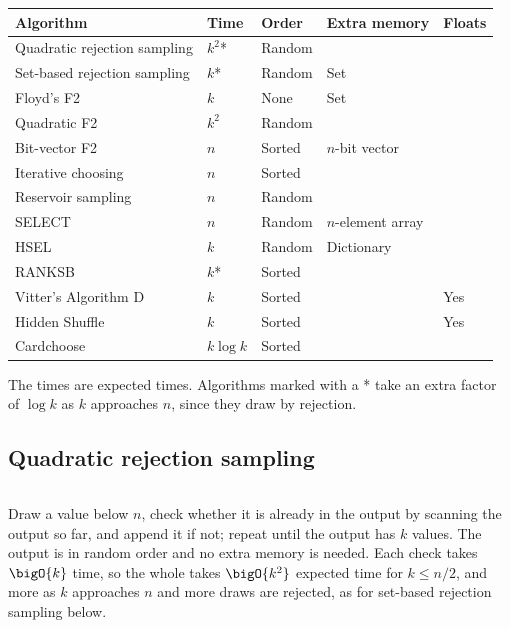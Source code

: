 \documentclass[letterpaper,11pt]{article}
\begin{document}
\begin{center}
    \begin{tabular}{l|l|l|l|l}
    Algorithm & Time & Order & Extra memory & Floats \\
    \hline
    Quadratic rejection sampling & \(k^2\)* & Random &  & \\
    Set-based rejection sampling & \(k\)* & Random & Set & \\
    Floyd's F2 & \(k\) & None & Set & \\
    Quadratic F2 & \(k^2\) & Random &  & \\
    Bit-vector F2 & \(n\) & Sorted & \(n\)-bit vector & \\
    Iterative choosing & \(n\) & Sorted &  & \\
    Reservoir sampling & \(n\) & Random &  & \\
    SELECT & \(n\) & Random & \(n\)-element array & \\
    HSEL & \(k\) & Random & Dictionary & \\
    RANKSB & \(k\)* & Sorted &  & \\
    Vitter's Algorithm D & \(k\) & Sorted &  & Yes \\
    Hidden Shuffle & \(k\) & Sorted &  & Yes \\
    Cardchoose & \(k \log k\) & Sorted &  &
    \end{tabular}
\end{center}

The times are expected times. Algorithms marked with a * take an extra
factor of \(\log k\) as \(k\) approaches \(n\), since they draw by
rejection.

\subsection{Quadratic rejection sampling}
\inputminted{Python}{code/quadraticreject.py}
Draw a value below \(n\), check whether it is already in the output by
scanning the output so far, and append it if not; repeat until the
output has \(k\) values. The output is in random order and no extra
memory is needed. Each check takes \(\bigO{k}\) time, so the whole
takes \(\bigO{k^2}\) expected time for \(k \leq n/2\), and more as
\(k\) approaches \(n\) and more draws are rejected, as for set-based
rejection sampling below.
\end{document}

